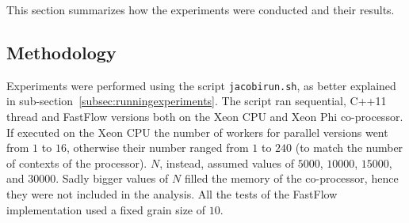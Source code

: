 This section summarizes how the experiments were conducted and their results.

\subsection{Methodology} \label{subsec:methodology}
Experiments were performed using the script \verb|jacobirun.sh|, as better explained in sub-section~\ref{subsec:runningexperiments}.
The script ran sequential, C++11 thread and FastFlow versions both on the Xeon CPU and Xeon Phi co-processor.
If executed on the Xeon CPU the number of workers for parallel versions went from $1$ to $16$, otherwise their number ranged from $1$ to $240$ (to match the number of contexts of the processor).
$N$, instead, assumed values of $5000$, $10000$, $15000$, and $30000$. 
Sadly bigger values of $N$ filled the memory of the co-processor, hence they were not included in the analysis.
All the tests of the FastFlow implementation used a fixed grain size of $10$.

